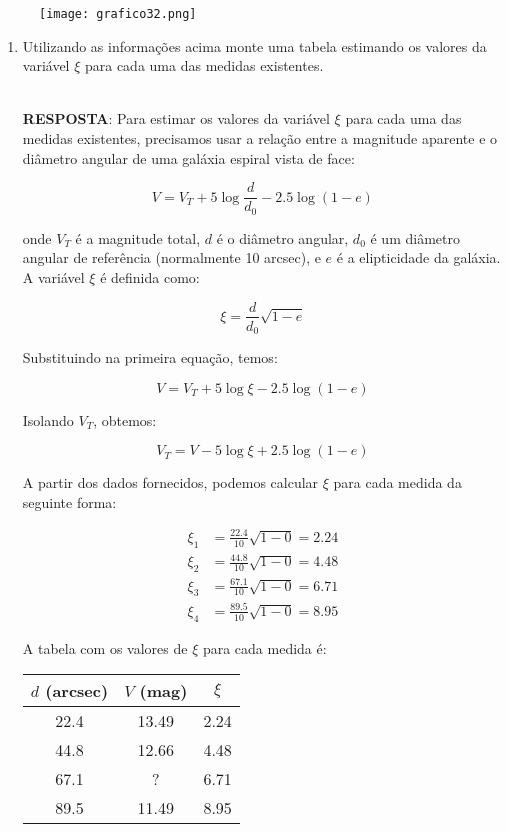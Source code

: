 \documentclass[a4paper,12pt]{article}
\begin{document}
\begin{enumerate}
\begin{figure}[H]
\centering
\texttt{[image: grafico32.png]}
\end{figure}

\begin{enumerate}
\item Utilizando as informações acima monte uma tabela estimando os valores da variável $\xi$ para cada uma das medidas existentes.

\noindent\hrulefill\\\textbf{RESPOSTA}: Para estimar os valores da variável $\xi$ para cada uma das medidas existentes, precisamos usar a relação entre a magnitude aparente e o diâmetro angular de uma galáxia espiral vista de face:

$$V = V_T + 5 \log \frac{d}{d_0} - 2.5 \log (1 - e)$$

onde $V_T$ é a magnitude total, $d$ é o diâmetro angular, $d_0$ é um diâmetro angular de referência (normalmente 10 arcsec), e $e$ é a elipticidade da galáxia. A variável $\xi$ é definida como:

$$\xi = \frac{d}{d_0} \sqrt{1 - e}$$

Substituindo na primeira equação, temos:

$$V = V_T + 5 \log \xi - 2.5 \log (1 - e)$$

Isolando $V_T$, obtemos:

$$V_T = V - 5 \log \xi + 2.5 \log (1 - e)$$

A partir dos dados fornecidos, podemos calcular $\xi$ para cada medida da seguinte forma:

\begin{align*}
\xi_1 &= \frac{22.4}{10} \sqrt{1 - 0} = 2.24\\
\xi_2 &= \frac{44.8}{10} \sqrt{1 - 0} = 4.48\\
\xi_3 &= \frac{67.1}{10} \sqrt{1 - 0} = 6.71\\
\xi_4 &= \frac{89.5}{10} \sqrt{1 - 0} = 8.95
\end{align*}

A tabela com os valores de $\xi$ para cada medida é:

\begin{center}
\begin{tabular}{|c|c|c|}
\hline
$d$ (arcsec) & $V$ (mag) & $\xi$ \\
\hline
22.4         & 13.49     & 2.24  \\
\hline
44.8         & 12.66     & 4.48  \\
\hline
67.1         & ?         & 6.71  \\
\hline
89.5         & 11.49     & 8.95  \\
\hline
\end{tabular}
\end{center}


\end{enumerate}
\end{enumerate}
\end{document}
